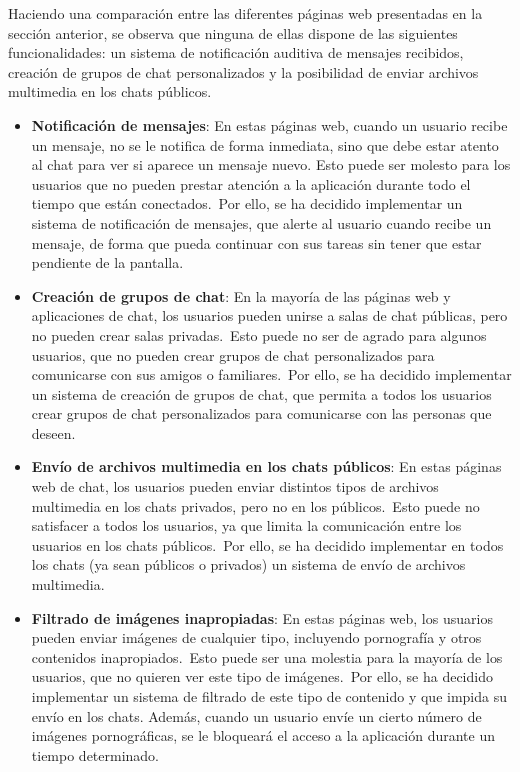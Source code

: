 
Haciendo una comparación entre las diferentes páginas web presentadas en la sección anterior, se
observa que ninguna de ellas dispone de las siguientes funcionalidades: un sistema de notificación auditiva
de mensajes recibidos, creación de grupos de chat personalizados y la posibilidad de enviar archivos
multimedia en los chats públicos.

\begin{itemize}
	\item \textbf{Notificación de mensajes}: En estas páginas web, cuando un usuario recibe un mensaje, no se le
	notifica de forma inmediata, sino que debe estar atento al chat para ver si aparece un mensaje nuevo.
	Esto puede ser molesto para los usuarios que no pueden prestar atención a la aplicación durante todo el
	tiempo que están conectados.\ Por ello, se ha decidido implementar un sistema de notificación de mensajes,
	que alerte al usuario cuando recibe un mensaje, de forma que pueda continuar con sus tareas sin tener que
	estar pendiente de la pantalla.

	\item \textbf{Creación de grupos de chat}: En la mayoría de las páginas web y aplicaciones de chat, los usuarios
	pueden unirse a salas de chat públicas, pero no pueden crear salas privadas.\ Esto puede no ser de agrado
	para algunos usuarios, que no pueden crear grupos de chat personalizados para comunicarse con sus amigos o
	familiares.\ Por ello, se ha decidido implementar un sistema de creación de grupos de chat, que permita a
	todos los usuarios crear grupos de chat personalizados para comunicarse con las personas que deseen.

	\item \textbf{Envío de archivos multimedia en los chats públicos}: En estas páginas web
	de chat, los usuarios pueden enviar distintos tipos de archivos multimedia en los chats privados, pero no en
	los públicos.\ Esto puede no satisfacer a todos los usuarios, ya que limita la comunicación entre los usuarios en
	los chats públicos.\ Por ello, se ha decidido implementar en todos los chats (ya sean públicos o privados) un
	sistema de envío de archivos multimedia.

	\item \textbf{Filtrado de imágenes inapropiadas}: En estas páginas web, los usuarios pueden enviar imágenes
	de cualquier tipo, incluyendo pornografía y otros contenidos inapropiados.\ Esto puede ser una molestia para
	la mayoría de los usuarios, que no quieren ver este tipo de imágenes.\ Por ello, se ha decidido implementar
	un sistema de filtrado de este tipo de contenido y que impida su envío en los chats.
	Además, cuando un usuario envíe un cierto número de imágenes pornográficas, se le bloqueará el acceso a la
	aplicación durante un tiempo determinado.
\end{itemize}
